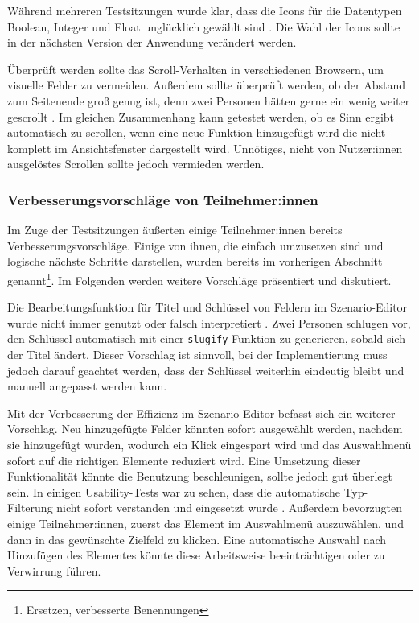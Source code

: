 Während mehreren Testsitzungen wurde klar, dass die Icons für die Datentypen Boolean, Integer und Float unglücklich gewählt sind . Die Wahl der Icons sollte in der nächsten Version der Anwendung verändert werden.

Überprüft werden sollte das Scroll-Verhalten in verschiedenen Browsern, um visuelle Fehler zu vermeiden. Außerdem sollte überprüft werden, ob der Abstand zum Seitenende groß genug ist, denn zwei Personen hätten gerne ein wenig weiter gescrollt . Im gleichen Zusammenhang kann getestet werden, ob es Sinn ergibt automatisch zu scrollen, wenn eine neue Funktion hinzugefügt wird die nicht komplett im Ansichtsfenster dargestellt wird. Unnötiges, nicht von Nutzer:innen ausgelöstes Scrollen sollte jedoch vermieden werden.



\subsubsection{Verbesserungsvorschläge von Teilnehmer:innen}

Im Zuge der Testsitzungen äußerten einige Teilnehmer:innen bereits Verbesserungsvorschläge. Einige von ihnen, die einfach umzusetzen sind und logische nächste Schritte darstellen, wurden bereits im vorherigen Abschnitt genannt\footnote{Ersetzen, verbesserte Benennungen}. Im Folgenden werden weitere Vorschläge präsentiert und diskutiert.

Die Bearbeitungsfunktion für Titel und Schlüssel von Feldern im Szenario-Editor wurde nicht immer genutzt oder falsch interpretiert . Zwei Personen schlugen vor, den Schlüssel automatisch mit einer \texttt{slugify}-Funktion zu generieren, sobald sich der Titel ändert. Dieser Vorschlag ist sinnvoll, bei der Implementierung muss jedoch darauf geachtet werden, dass der Schlüssel weiterhin eindeutig bleibt und manuell angepasst werden kann.

Mit der Verbesserung der Effizienz im Szenario-Editor befasst sich ein weiterer Vorschlag. Neu hinzugefügte Felder könnten sofort ausgewählt werden, nachdem sie hinzugefügt wurden, wodurch ein Klick eingespart wird und das Auswahlmenü sofort auf die richtigen Elemente reduziert wird. Eine Umsetzung dieser Funktionalität könnte die Benutzung beschleunigen, sollte jedoch gut überlegt sein. In einigen Usability-Tests war zu sehen, dass die automatische Typ-Filterung nicht sofort verstanden und eingesetzt wurde . Außerdem bevorzugten einige Teilnehmer:innen, zuerst das Element im Auswahlmenü auszuwählen, und dann in das gewünschte Zielfeld zu klicken. Eine automatische Auswahl nach Hinzufügen des Elementes könnte diese Arbeitsweise beeinträchtigen oder zu Verwirrung führen.

